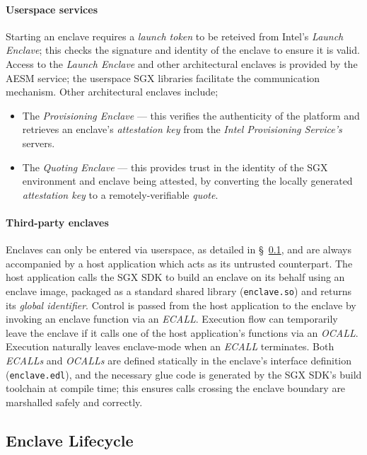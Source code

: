 \paragraph{Userspace services} Starting an enclave requires a \textit{launch token} to be reteived from Intel's \textit{Launch Enclave}; this checks the signature and identity of the enclave to ensure it is valid. Access to the \textit{Launch Enclave} and other architectural enclaves is provided by the AESM service; the userspace SGX libraries facilitate the communication mechanism. Other architectural enclaves include;

\begin{itemize}
    \item The \textit{Provisioning Enclave} --- this verifies the authenticity of the platform and retrieves an enclave's \textit{attestation key} from the \textit{Intel Provisioning Service's} servers.
    \item The \textit{Quoting Enclave} --- this provides trust in the identity of the SGX environment and enclave being attested, by converting the locally generated \textit{attestation key} to a remotely-verifiable \textit{quote}.
\end{itemize}

\paragraph{Third-party enclaves} Enclaves can only be entered via userspace, as detailed in §~\ref{sec:sgx-lifecycle}, and are always accompanied by a host application which acts as its untrusted counterpart. The host application calls the SGX SDK to build an enclave on its behalf using an enclave image, packaged as a standard shared library (\texttt{enclave.so}) and returns its \textit{global identifier}. Control is passed from the host application to the enclave by invoking an enclave function via an \textit{ECALL}. Execution flow can temporarily leave the enclave if it calls one of the host application's functions via an \textit{OCALL}. Execution naturally leaves enclave-mode when an \textit{ECALL} terminates. Both \textit{ECALLs} and \textit{OCALLs} are defined statically in the enclave's interface definition (\texttt{enclave.edl}), and the necessary glue code is generated by the SGX SDK's build toolchain at compile time; this ensures calls crossing the enclave boundary are marshalled safely and correctly.


\subsection{Enclave Lifecycle}
\label{sec:sgx-lifecycle}

